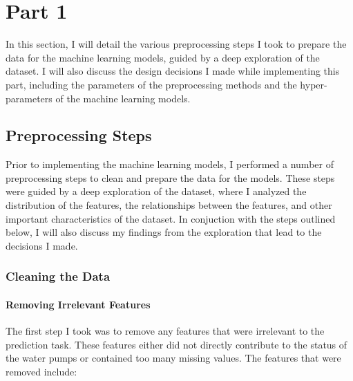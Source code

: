 \documentclass{article}
\begin{document}
\section{Part 1}
In this section, I will detail the various preprocessing steps I took to prepare the data for the machine learning models, guided by a deep exploration of the dataset. I will also discuss the design decisions I made while implementing this part, including the parameters of the preprocessing methods and the hyper-parameters of the machine learning models.

\subsection{Preprocessing Steps}
Prior to implementing the machine learning models, I performed a number of preprocessing steps to clean and prepare the data for the models. These steps were guided by a deep exploration of the dataset, where I analyzed the distribution of the features, the relationships between the features, and other important characteristics of the dataset. In conjuction with the steps outlined below, I will also discuss my findings from the exploration that lead to the decisions I made.

\subsubsection{Cleaning the Data}

\paragraph{Removing Irrelevant Features}
The first step I took was to remove any features that were irrelevant to the prediction task. These features either did not directly contribute to the status of the water pumps or contained too many missing values. The features that were removed include:
\end{document}

